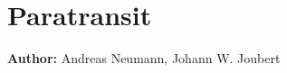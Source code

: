 
\section{Paratransit}
\label{sec:paratransit}
\hfill \textbf{Author:} Andreas Neumann, Johann W. Joubert









